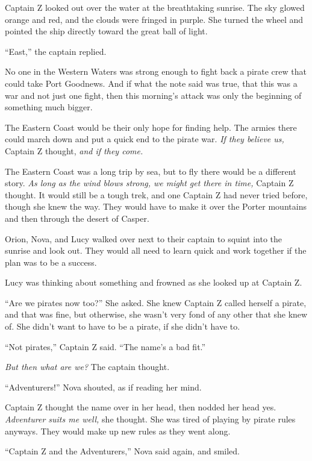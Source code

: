 \documentclass[12pt]{extbook}
\begin{document}
  Captain Z looked out over the water at the breathtaking sunrise. The sky
  glowed orange and red, and the clouds were fringed in purple. She turned
  the wheel and pointed the ship directly toward the great ball of light.
  
  \enquote{East,} the captain replied.
  
  No one in the Western Waters was strong enough to fight back a pirate
  crew that could take Port Goodnews. And if what the note said was true,
  that this was a war and not just one fight, then this morning's attack
  was only the beginning of something much bigger.
  
  The Eastern Coast would be their only hope for finding help. The armies
  there could march down and put a quick end to the pirate war. \emph{If
  they believe us,} Captain Z thought, \emph{and if they come.}
  
  The Eastern Coast was a long trip by sea, but to fly there would be a
  different story. \emph{As long as the wind blows strong, we might get
  there in time,} Captain Z thought. It would still be a tough trek, and
  one Captain Z had never tried before, though she knew the way. They
  would have to make it over the Porter mountains and then through the
  desert of Casper.
  
  Orion, Nova, and Lucy walked over next to their captain to squint into
  the sunrise and look out. They would all need to learn quick and work
  together if the plan was to be a success.
  
  Lucy was thinking about something and frowned as she looked up at
  Captain Z.
  
  \enquote{Are we pirates now too?} She asked. She knew Captain Z called
  herself a pirate, and that was fine, but otherwise, she wasn't very fond
  of any other that she knew of. She didn't want to have to be a pirate,
  if she didn't have to.
  
  \enquote{Not pirates,} Captain Z said. \enquote{The name's a bad fit.}
  
  \emph{But then what are we?} The captain thought.
  
  \enquote{Adventurers!} Nova shouted, as if reading her mind.
  
  Captain Z thought the name over in her head, then nodded her head yes.
  \emph{Adventurer suits me well,} she thought. She was tired of playing
  by pirate rules anyways. They would make up new rules as they went
  along.
  
  \enquote{Captain Z and the Adventurers,} Nova said again, and smiled.
  
\end{document}
